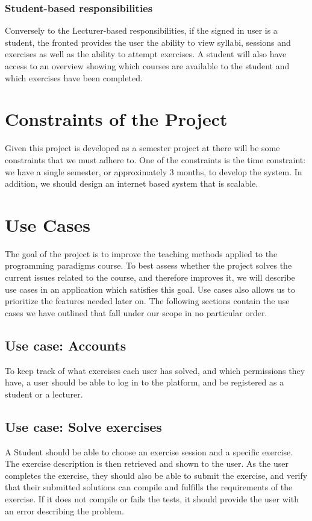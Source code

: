 \subsubsection*{Student-based responsibilities}
Conversely to the Lecturer-based responsibilities, if the signed in user is a student, the fronted provides the user the ability to view syllabi, sessions and exercises as well as the ability to attempt exercises. A student will also have access to an overview showing which courses are available to the student and which exercises have been completed.


\section*{Constraints of the Project}
Given this project is developed as a semester project at \aau{} there will be some constraints that we must adhere to.
One of the constraints is the time constraint: we have a single semester, or approximately 3 months, to develop the system.
In addition, we should design an internet based system that is scalable.

\section*{Use Cases} \label{sec:use_cases}
The goal of the project is to improve the teaching methods applied to the programming paradigms course.
To best assess whether the project solves the current issues related to the course, and therefore improves it, we will describe use cases in an application which satisfies this goal.
Use cases also allows us to prioritize the features needed later on.
The following sections contain the use cases we have outlined that fall under our scope in no particular order.

\subsection*{Use case: Accounts}
To keep track of what exercises each user has solved, and which permissions they have, a user should be able to log in to the platform, and be registered as a student or a lecturer.

\subsection*{Use case: Solve exercises}
A Student should be able to choose an exercise session and a specific exercise. The exercise description is then retrieved and shown to the user.
As the user completes the exercise, they should also be able to submit the exercise, and verify that their submitted solutions can compile and fulfills the requirements of the exercise. If it does not compile or fails the tests, it should provide the user with an error describing the problem.

